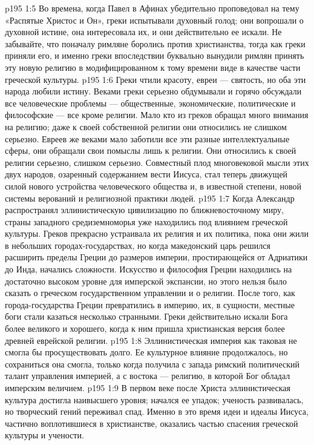 \vs p195 1:5 \pc Во времена, когда Павел в Афинах убедительно проповедовал на тему «Распятые Христос и Он», греки испытывали духовный голод; они вопрошали о духовной истине, она интересовала их, и они действительно ее искали. Не забывайте, что поначалу римляне боролись против христианства, тогда как греки приняли его, и именно греки впоследствии буквально вынудили римлян принять эту новую религию в модифицированном к тому времени виде в качестве части греческой культуры.
\vs p195 1:6 Греки чтили красоту, евреи --- святость, но оба эти народа любили истину. Веками греки серьезно обдумывали и горячо обсуждали все человеческие проблемы --- общественные, экономические, политические и философские --- все кроме религии. Мало кто из греков обращал много внимания на религию; даже к своей собственной религии они относились не слишком серьезно. Евреев же веками мало заботили все эти разные интеллектуальные сферы, они обращали свои помыслы лишь к религии. Они относились к своей религии серьезно, слишком серьезно. Совместный плод многовековой мысли этих двух народов, озаренный содержанием вести Иисуса, стал теперь движущей силой нового устройства человеческого общества и, в известной степени, новой системы верований и религиозной практики людей.
\vs p195 1:7 \pc Когда Александр распространял эллинистическую цивилизацию по ближневосточному миру, страны западного средиземноморья уже находились под влиянием греческой культуры. Греков прекрасно устраивала их религия и их политика, пока они жили в небольших городах\hyp{}государствах, но когда македонский царь решился расширить пределы Греции до размеров империи, простирающейся от Адриатики до Инда, начались сложности. Искусство и философия Греции находились на достаточно высоком уровне для имперской экспансии, но этого нельзя было сказать о греческом государственном управлении и о религии. После того, как города\hyp{}государства Греции превратились в империю, их, в сущности, местные боги стали казаться несколько странными. Греки действительно искали  Бога более великого и хорошего, когда к ним пришла христианская версия более древней еврейской религии.
\vs p195 1:8 Эллинистическая империя как таковая не смогла бы просуществовать долго. Ее культурное влияние продолжалось, но сохраниться она смогла, только когда получила с запада римский политический талант управления империей, а с востока --- религию, в которой Бог обладал имперским величием.
\vs p195 1:9 В первом веке после Христа эллинистическая культура достигла наивысшего уровня; начался ее упадок; ученость развивалась, но творческий гений переживал спад. Именно в это время идеи и идеалы Иисуса, частично воплотившиеся в христианстве, оказались частью спасения греческой культуры и учености.
